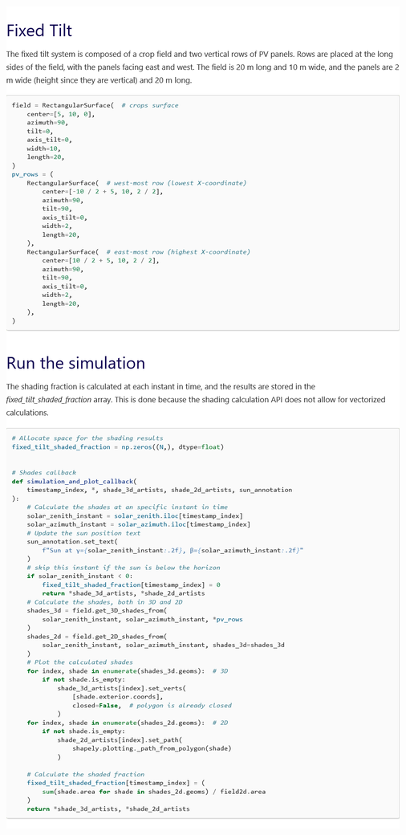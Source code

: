 \begin{myparindent}{0pt}
\includegraphics[width=\linewidth,height=0.9\textheight,keepaspectratio]{images/docs_examples_cut/shading_anim_1.png}


\end{myparindent}
